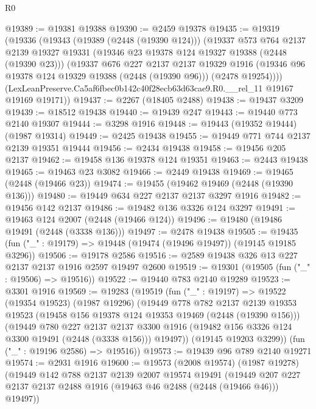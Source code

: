 \begin{lexlean}{R0}
\begin{coremodule}
@19389 := @19381 @19388
@19390 := @2459 @19378
@19435 := @19319
    (@19336
      (@19343
        (@19389 (@2448 (@19390 @124)))
        (@19337
          @573
          @764
          @2137
          @2139
          @19327
          @19331
          (@19346 @23 @19378 @124 @19327 @19388 (@2448 (@19390 @23)))
          (@19337
            @676
            @227
            @2137
            @2137
            @19329
            @1916
            (@19346 @96 @19378 @124 @19329 @19388 (@2448 (@19390 @96)))
            (@2478 @19254))))
      (LexLeanPreserve.Ca5af6fbec0b142c40f28ecb63d63cae9.R0.__rel_11 @19167 @19169 @19171))
@19437 := @2267 (@18405 @2488)
@19438 := @19437 @3209
@19439 := @18512 @19438
@19440 := @19439 @247
@19443 := @19440 @773 @2140 @19307
@19444 := @3298 @1916
@19448 := @19443 (@19352 @19444) (@1987 @19314)
@19449 := @2425 @19438
@19455 := @19449 @771 @744 @2137 @2139 @19351 @19444
@19456 := @2434 @19438
@19458 := @19456 @205 @2137
@19462 := @19458 @136 @19378 @124 @19351
@19463 := @2443 @19438
@19465 := @19463 @23 @3082
@19466 := @2449 @19438
@19469 := @19465 (@2448 (@19466 @23))
@19474 := @19455 (@19462 @19469 (@2448 (@19390 @136)))
@19480 := @19449 @634 @227 @2137 @2137 @3297 @1916
@19482 := @19456 @142 @2137
@19486 := @19482 @136 @3326 @124 @3297
@19491 := @19463 @124 @2007 (@2448 (@19466 @124))
@19496 := @19480 (@19486 @19491 (@2448 (@3338 @136)))
@19497 := @2478 @19438
@19505 := @19435 (fun ("_" : @19179) => @19448 (@19474 (@19496 @19497)) (@19145 @19185 @3296))
@19506 := @19178 @2586
@19516 := @2589 @19438 @326 @13 @227 @2137 @2137 @1916 @2597 @19497 @2600
@19519 := @19301 (@19505 (fun ("_" : @19506) => @19516))
@19522 := @19440 @783 @2140 @19289
@19523 := @3301 @1916
@19569 := @19283
    (@19519
      (fun ("_" : @19197) =>
      @19522
        (@19354 @19523)
        (@1987 @19296)
        (@19449
          @778
          @782
          @2137
          @2139
          @19353
          @19523
          (@19458 @156 @19378 @124 @19353 @19469 (@2448 (@19390 @156)))
          (@19449
            @780
            @227
            @2137
            @2137
            @3300
            @1916
            (@19482 @156 @3326 @124 @3300 @19491 (@2448 (@3338 @156)))
            @19497))
        (@19145 @19203 @3299))
      (fun ("_" : @19196 @2586) => @19516))
@19573 := @19439 @96 @789 @2140 @19271
@19574 := @2931 @1916
@19600 := @19573
    (@2008 @19574)
    (@1987 @19278)
    (@19449
      @142
      @788
      @2137
      @2139
      @2007
      @19574
      @19491
      (@19449 @207 @227 @2137 @2137 @2488 @1916 (@19463 @46 @2488 (@2448 (@19466 @46))) @19497))

\end{coremodule}
\end{lexlean}
